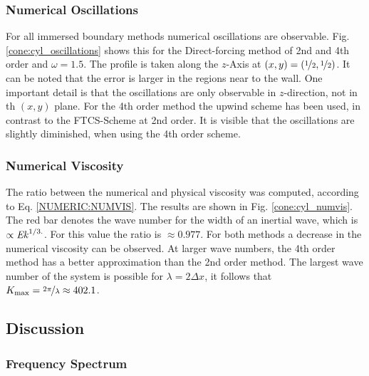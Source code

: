 \subsubsection{Numerical Oscillations}

For all immersed boundary methods numerical oscillations are observable.
Fig. \ref{cone:cyl_oscillations} shows this for the Direct-forcing method of 2nd and 4th order and $\omega=1.5$.
The profile is taken along the $z$-Axis at $(x,y)=(\nicefrac{1}{2},\nicefrac{1}{2})$.
It can be noted that the error is larger in the regions near to the wall.
One important detail is that the oscillations are only observable in $z$-direction, not
in th $(x,y)$ plane.
For the 4th order method the upwind scheme has been used, in contrast to the FTCS-Scheme at 2nd order.
It is visible that the oscillations are slightly diminished, when using the 4th order scheme.

\subsubsection{Numerical Viscosity}

The ratio between the numerical and physical viscosity was computed, according to Eq. \ref{NUMERIC:NUMVIS}.
The results are shown in Fig. \ref{cone:cyl_numvis}.
The red bar denotes the wave number for the width of an inertial wave, which is $\propto \mbox{\textit{Ek}}^{1/3.}$.
For this value the ratio is $\approx{0.977}$.
For both methods a decrease in the numerical viscosity can  be observed.
At larger wave numbers, the 4th order method has a better approximation than the 2nd order method.
The largest wave number of the  system is possible for $\lambda = 2\Delta x$,
it follows that $K_{\text{max}} = \nicefrac{2\pi}{\lambda} \approx 402.1$.
\clearpage

\subsection{Discussion}

\subsubsection{Frequency Spectrum}

